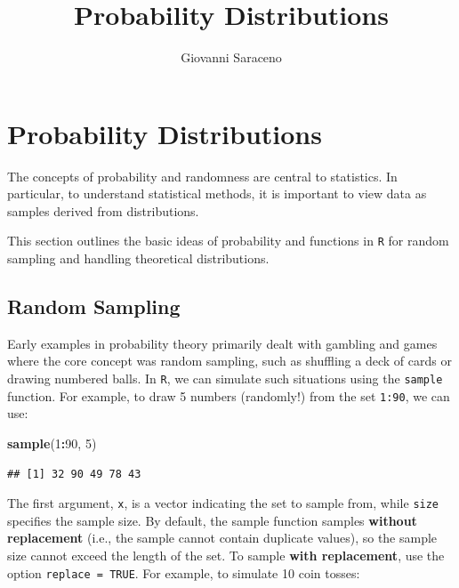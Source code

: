 \documentclass[
]{article}
\title{Probability Distributions}
\author{Giovanni Saraceno}
\date{}
\newenvironment{Shaded}{\begin{snugshade}}{\end{snugshade}}
\newcommand{\DecValTok}[1]{\textcolor[rgb]{0.00,0.00,0.81}{#1}}
\newcommand{\FunctionTok}[1]{\textcolor[rgb]{0.13,0.29,0.53}{\textbf{#1}}}
\newcommand{\NormalTok}[1]{#1}
\newcommand{\SpecialCharTok}[1]{\textcolor[rgb]{0.81,0.36,0.00}{\textbf{#1}}}
\begin{document}
\maketitle

{
\setcounter{tocdepth}{2}
\tableofcontents
}
\hypertarget{probability-distributions}{%
\section{Probability Distributions}\label{probability-distributions}}

The concepts of probability and randomness are central to statistics. In
particular, to understand statistical methods, it is important to view
data as samples derived from distributions.

This section outlines the basic ideas of probability and functions in
\texttt{R} for random sampling and handling theoretical distributions.

\hypertarget{random-sampling}{%
\subsection{Random Sampling}\label{random-sampling}}

Early examples in probability theory primarily dealt with gambling and
games where the core concept was random sampling, such as shuffling a
deck of cards or drawing numbered balls. In \texttt{R}, we can simulate
such situations using the \texttt{sample} function. For example, to draw
5 numbers (randomly!) from the set \texttt{1:90}, we can use:

\begin{Shaded}
\begin{Highlighting}[]
\FunctionTok{sample}\NormalTok{(}\DecValTok{1}\SpecialCharTok{:}\DecValTok{90}\NormalTok{, }\DecValTok{5}\NormalTok{)}
\end{Highlighting}
\end{Shaded}

\begin{verbatim}
## [1] 32 90 49 78 43
\end{verbatim}

The first argument, \texttt{x}, is a vector indicating the set to sample
from, while \texttt{size} specifies the sample size. By default, the
sample function samples \textbf{without replacement} (i.e., the sample
cannot contain duplicate values), so the sample size cannot exceed the
length of the set. To sample \textbf{with replacement}, use the option
\texttt{replace\ =\ TRUE}. For example, to simulate 10 coin tosses:
\end{document}
